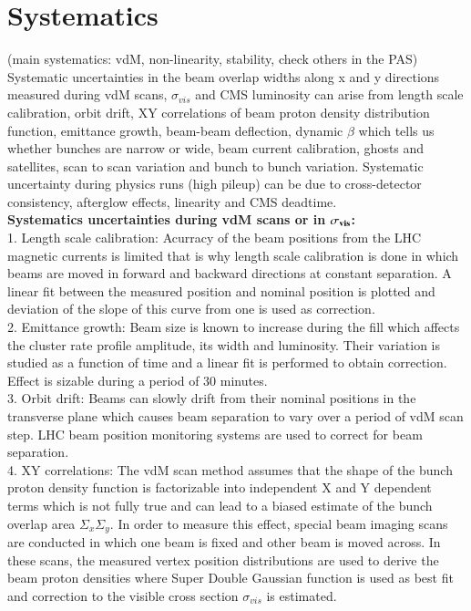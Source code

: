 \section{Systematics}
\label{sec:syst}
(main systematics: vdM, non-linearity, stability, check others in the PAS) \\

Systematic uncertainties in the beam overlap widths along x and y directions measured during vdM scans, $\sigma_{vis}$ and CMS luminosity can arise from length scale calibration, orbit drift, XY correlations of beam proton density distribution function, emittance growth, beam-beam deflection, dynamic $\beta$ which tells us whether bunches are narrow or wide, beam current calibration, ghosts and satellites, scan to scan variation and bunch to bunch variation. Systematic uncertainty during physics runs (high pileup) can be due to cross-detector consistency, afterglow effects, linearity and CMS deadtime. \\

\textbf{Systematics uncertainties during vdM scans or in $\bf{\sigma_{vis}}$:} \\

1. Length scale calibration: Acurracy of the beam positions from the LHC magnetic currents is limited that is why length scale calibration is done in which beams are moved in forward and backward directions at constant separation. A linear fit between the measured position and nominal position is plotted and deviation of the slope of this curve from one is used as correction. \\

2. Emittance growth: Beam size is known to increase during the fill which affects the cluster rate profile amplitude, its width and luminosity. Their variation is studied as a function of time and a linear fit is performed to obtain correction. Effect is sizable during a period of 30 minutes. \\

3. Orbit drift: Beams can slowly drift from their nominal positions in the transverse plane which causes beam separation to vary over a period of vdM scan step. LHC beam position monitoring systems are used to correct for beam separation. \\

4. XY correlations: The vdM scan method assumes that the shape of the bunch proton density function is factorizable into independent X and Y dependent terms which is not fully true and can lead to a biased estimate of the bunch overlap area $\Sigma_x \Sigma_y$. In order to measure this effect, special beam imaging scans are conducted in which one beam is fixed and other beam is moved across. In these scans, the measured vertex position distributions are used to derive the beam proton densities where Super Double Gaussian function is used as best fit and correction to the visible cross section $\sigma_{vis}$ is estimated. \\

